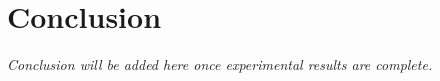 \documentclass[../main.tex]{subfiles}
\begin{document}
\section{Conclusion}
\justify

\textit{Conclusion will be added here once experimental results are complete.}
\end{document}
